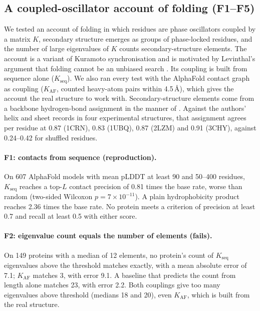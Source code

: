 \subsection{A coupled-oscillator account of folding (F1--F5)}
\label{sec:res-folding}

We tested an account of folding in which residues are phase oscillators coupled by a matrix $K$, secondary structure emerges as groups of phase-locked residues, and the number of large eigenvalues of $K$ counts secondary-structure elements.
The account is a variant of Kuramoto synchronisation \citep{kuramoto1984chemical} and is motivated by Levinthal's argument that folding cannot be an unbiased search \citep{levinthal1969fold,dill2012folding}.
Its coupling is built from sequence alone ($K_{\mathrm{seq}}$).
We also ran every test with the AlphaFold contact graph as coupling ($K_{\mathrm{AF}}$, counted heavy-atom pairs within 4.5\,\AA), which gives the account the real structure to work with.
Secondary-structure elements come from a backbone hydrogen-bond assignment in the manner of \citet{kabsch1983dssp}.
Against the authors' helix and sheet records in four experimental structures, that assignment agrees per residue at 0.87 (1CRN), 0.83 (1UBQ), 0.87 (2LZM) and 0.91 (3CHY), against 0.24--0.42 for shuffled residues.

\paragraph{F1: contacts from sequence (reproduction).}
On 607 AlphaFold models with mean pLDDT at least 90 and 50--400 residues, $K_{\mathrm{seq}}$ reaches a top-$L$ contact precision of 0.81 times the base rate, worse than random (two-sided Wilcoxon $p=7\times10^{-11}$).
A plain hydrophobicity product reaches 2.36 times the base rate.
No protein meets a criterion of precision at least 0.7 and recall at least 0.5 with either score.

\paragraph{F2: eigenvalue count equals the number of elements (fails).}
On 149 proteins with a median of 12 elements, no protein's count of $K_{\mathrm{seq}}$ eigenvalues above the threshold matches exactly, with a mean absolute error of 7.1; $K_{\mathrm{AF}}$ matches 3, with error 9.1.
A baseline that predicts the count from length alone matches 23, with error 2.2.
Both couplings give too many eigenvalues above threshold (medians 18 and 20), even $K_{\mathrm{AF}}$, which is built from the real structure.

